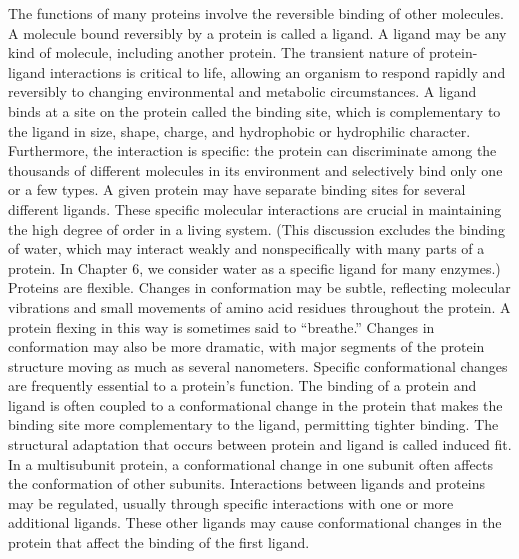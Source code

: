 The functions of many proteins involve the reversible binding of other molecules. A molecule bound reversibly by a protein is called a ligand. A ligand may be any kind of molecule, including another protein. The transient nature of protein-ligand interactions is critical to life, allowing an organism to respond rapidly and reversibly to changing environmental and metabolic circumstances. A ligand binds at a site on the protein called the binding site, which is complementary to the ligand in size, shape, charge, and hydrophobic or hydrophilic character. Furthermore, the interaction is specific: the protein can discriminate among the thousands of different molecules in its environment and selectively bind only one or a few types. A given protein may have separate binding sites for several different ligands. These specific molecular interactions are crucial in maintaining the high degree of order in a living system. (This discussion excludes the binding of water, which may interact weakly and nonspecifically with many parts of a protein. In Chapter 6, we consider water as a specific ligand for many enzymes.) Proteins are flexible. Changes in conformation may be subtle, reflecting molecular vibrations and small movements of amino acid residues throughout the protein. A protein flexing in this way is sometimes said to “breathe.” Changes in conformation may also be more dramatic, with major segments of the protein structure moving as much as several nanometers. Specific conformational changes are frequently essential to a protein’s function. The binding of a protein and ligand is often coupled to a conformational change in the protein that makes the binding site more complementary to the ligand, permitting tighter binding. The structural adaptation that occurs between protein and ligand is called induced fit. In a multisubunit protein, a conformational change in one subunit often affects the conformation of other subunits. Interactions between ligands and proteins may be regulated, usually through specific interactions with one or more additional ligands. These other ligands may cause conformational changes in the protein that affect the binding of the first ligand. 

